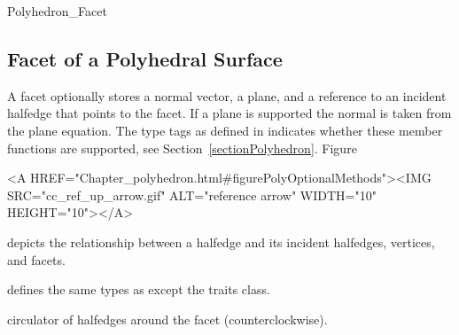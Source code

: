 \begin{ccClass}{Polyhedron_Facet}
\subsection{Facet of a Polyhedral Surface}

\ccDefinition

A facet optionally stores a normal vector, a plane, and a reference to
an incident halfedge that points to the facet.  If a plane is
supported the normal is taken from the plane equation.  The type tags
as defined in  indicates whether these
member functions are supported, see Section~\ref{sectionPolyhedron}.
Figure~\ccTexHtml{\ref{figurePolyOptionalMethods}}{}\begin{ccHtmlOnly}
  <A HREF="Chapter_polyhedron.html#figurePolyOptionalMethods"><IMG 
  SRC="cc_ref_up_arrow.gif" ALT="reference arrow" WIDTH="10" HEIGHT="10"></A>
\end{ccHtmlOnly}
depicts the relationship between a
halfedge and its incident halfedges, vertices, and facets.


\ccTypes

 defines the same types as  except
the traits class.


\ccGlue
{}
\ccGlue
{}

    {circulator of halfedges around the facet (counterclockwise).}

\end{ccClass}


